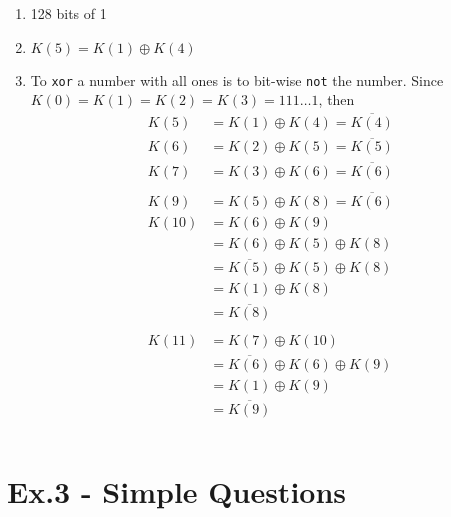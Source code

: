 \documentclass[12pt]{article}
\begin{document}
	\begin{enumerate}
		\item
			128 bits of 1
		\item
			$K(5)=K(1)\oplus K(4)$
		\item
			To \texttt{xor} a number with all ones is to bit-wise \texttt{not} the number. Since $K(0)=K(1)=K(2)=K(3)=111\ldots1$, then
			\begin{align*}
				K(5)&=K(1)\oplus K(4)=\overline{K(4)}\\
				K(6)&=K(2)\oplus K(5)=\overline{K(5)}\\
				K(7)&=K(3)\oplus K(6)=\overline{K(6)}\\\\
				K(9)&=K(5)\oplus K(8)=\overline{K(6)}\\
				K(10)&=K(6)\oplus K(9)\\
				&=K(6)\oplus K(5)\oplus K(8)\\
				&=\overline{K(5)}\oplus K(5)\oplus K(8)\\
				&=K(1)\oplus K(8)\\
				&=\overline{K(8)}\\\\
				K(11)&=K(7)\oplus K(10)\\
				&=\overline{K(6)}\oplus K(6)\oplus K(9)\\
				&=K(1)\oplus K(9)\\
				&=\overline{K(9)}\\\\
			\end{align*}
	\end{enumerate}

\section*{Ex.3 - Simple Questions}
\end{document}
